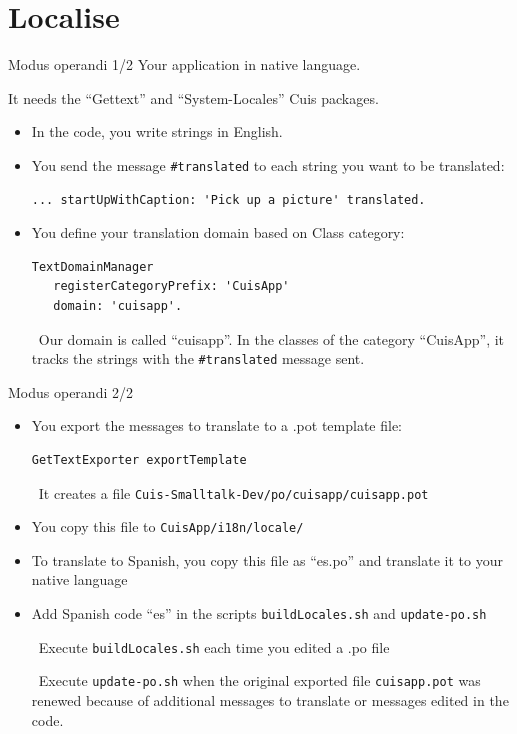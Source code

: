 \documentclass{beamer}
\newcommand{\tip}{\boldmath{\textcolor{red}{$\Rightarrow$}}}
\begin{document}
\section{Localise}
\begin{frame}[fragile]{ Modus operandi 1/2}
\fontsize{10pt}{8pt}\selectfont
Your application in native language.

It needs the ``Gettext'' and ``System-Locales'' Cuis packages.
  \begin{itemize}
  \item In the code, you write strings in English. 
  \item You send the message \texttt{\#translated} to each string you
    want to be translated:
    \begin{lstlisting}[language=Smalltalk]
... startUpWithCaption: 'Pick up a picture' translated.
    \end{lstlisting}
  \item You define your translation domain based on Class category:
    \begin{lstlisting}[language=Smalltalk]
TextDomainManager
   registerCategoryPrefix: 'CuisApp'
   domain: 'cuisapp'.
 \end{lstlisting}
 \tip\ Our domain is called ``cuisapp''. In the classes of the
 category ``CuisApp'', it tracks the strings with the
 \texttt{\#translated} message sent.
 
\end{itemize}
\end{frame}
%
\begin{frame}[fragile]{ Modus operandi 2/2}
  \begin{itemize}
  \item You export the messages to translate to a .pot template file:
    \begin{lstlisting}[language=Smalltalk]
GetTextExporter exportTemplate
\end{lstlisting}
\tip\ It creates a file \texttt{Cuis-Smalltalk-Dev/po/cuisapp/cuisapp.pot}
\item You copy this file to \texttt{CuisApp/i18n/locale/}
\item To translate to Spanish, you copy this file as ``es.po'' and
  translate it to your native language
\item Add Spanish code ``es'' in the scripts \texttt{buildLocales.sh}
  and \texttt{update-po.sh}
  
  \tip\ Execute \texttt{buildLocales.sh} each time you edited a .po
  file

  \tip\ Execute \texttt{update-po.sh} when the original exported file
  \texttt{cuisapp.pot} was renewed because of additional messages to
  translate or messages edited in the code.
  \end{itemize}
\end{frame}
\end{document}
